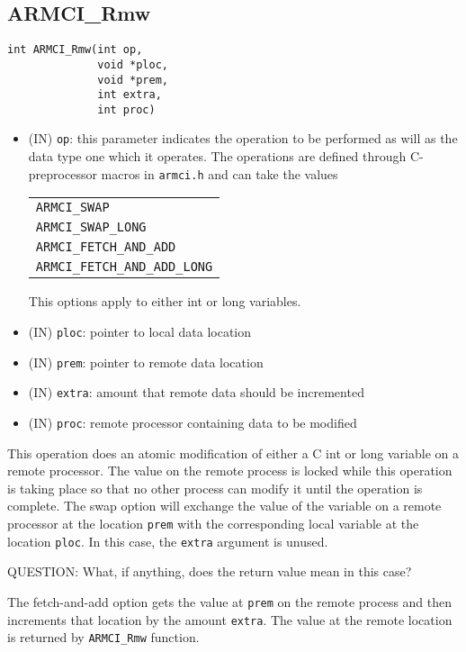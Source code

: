 \documentclass[12pt]{article}
\begin{document}
\subsection{ARMCI\_Rmw}
\begin{verbatim}
int ARMCI_Rmw(int op,
              void *ploc,
              void *prem,
              int extra,
              int proc)
\end{verbatim}
\begin{itemize}
\item (IN) \texttt{op}: this parameter indicates the operation to be performed
as will as the data type one which it operates. The operations are defined
through C-preprocessor macros in \texttt{armci.h} and can take the values
\newline
\begin{center}
\begin{tabular}{l}
\texttt{ARMCI\_SWAP} \\
\texttt{ARMCI\_SWAP\_LONG} \\
\texttt{ARMCI\_FETCH\_AND\_ADD} \\
\texttt{ARMCI\_FETCH\_AND\_ADD\_LONG}
\end{tabular}
\newline
\end{center}
This options apply to either int or long variables.
\item (IN) \texttt{ploc}: pointer to local data location
\item (IN) \texttt{prem}: pointer to remote data location
\item (IN) \texttt{extra}: amount that remote data should be incremented
\item (IN) \texttt{proc}: remote processor containing data to be modified
\end{itemize}
This operation does an atomic modification of either a C int or long
variable on a remote processor. The value on the remote process is locked while
this operation is taking place so that no other process can modify it until the
operation is complete. The swap option will exchange the value of the
variable on a remote processor at the location \texttt{prem} with the
corresponding local variable at the location \texttt{ploc}. In this case, the
\texttt{extra} argument is unused.

QUESTION: What, if anything, does the return value mean in this case?

The fetch-and-add option gets the value at \texttt{prem} on the remote process
and then increments that location by the amount \texttt{extra}. The value at the
remote location is returned by \texttt{ARMCI\_Rmw} function.
\end{document}
